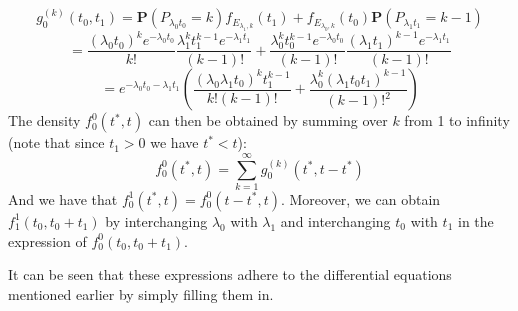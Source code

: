 $$
g_0^{(k)}(t_0,t_1)=\mathbf{P}(P_{\lambda_0t_0}=k)f_{E_{\lambda_1,k}}(t_1)+f_{E_{\lambda_0,k}}(t_0)\mathbf{P}(P_{\lambda_1t_1}=k-1)
$$
$$
=\frac{(\lambda_0t_0)^ke^{-\lambda_0t_0}}{k!}\frac{\lambda_1^kt_1^{k-1}e^{-\lambda_1t_1}}{(k-1)!}+\frac{\lambda_0^kt_0^{k-1}e^{-\lambda_0t_0}}{(k-1)!}\frac{(\lambda_1t_1)^{k-1}e^{-\lambda_1t_1}}{(k-1)!}
$$
$$
=e^{-\lambda_0t_0-\lambda_1t_1}(\frac{(\lambda_0\lambda_1t_0)^kt_1^{k-1}}{k!(k-1)!}+\frac{\lambda_0^k(\lambda_1t_0t_1)^{k-1}}{(k-1)!^2})
$$
The density $f_0^0(t^*,t)$ can then be obtained by summing over $k$ from 1 to infinity (note that since $t_1>0$ we have $t^*<t$):
$$
f_0^0(t^*,t)=\sum\limits_{k=1}^\infty g_0^{(k)}(t^*,t-t^*)
$$
And we have that $f_0^1(t^*,t)=f_0^0(t-t^*,t)$. Moreover, we can obtain $f_1^1(t_0,t_0+t_1)$ by interchanging $\lambda_0$ with $\lambda_1$ and interchanging $t_0$ with $t_1$ in the expression of $f_0^0(t_0,t_0+t_1)$.

It can be seen that these expressions adhere to the differential equations mentioned earlier by simply filling them in.

